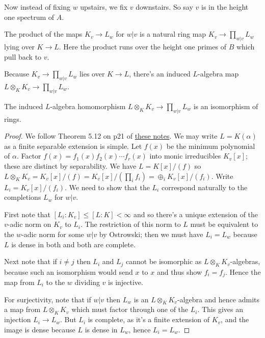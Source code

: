 Now instead of fixing $w$ upstairs, we fix $v$ downstairs. So say $v$ is in the height one
spectrum of $A$.

\begin{definition}
  \label{IsDedekindDomain.HeightOneSpectrum.adicCompletionComapSemialgHom'}
  \leanok
  The product of the maps $K_v\to L_w$ for $w|v$ is a natural ring map $K_v\to\prod_{w|v}L_w$
  lying over $K\to L$. Here the product runs over the height one primes of $B$ which pull back to $v$.
\end{definition}

Because $K_v\to\prod_{w|v}L_w$ lies over $K\to L$, there's an induced $L$-algebra
map $L\otimes_KK_v\to\prod_{w|v}L_w$.

\begin{theorem}
  \label{IsDedekindDomain.HeightOneSpectrum.adicCompletionComapAlgEquiv}
  \leanok
  The induced $L$-algebra homomorphism $L\otimes_KK_v\to\prod_{w|v}L_w$ is an
  isomorphism of rings.
\end{theorem}
\begin{proof}
  We follow Theorem 5.12 on p21 of \href{https://math.berkeley.edu/~ltomczak/notes/Mich2022/LF_Notes.pdf}
  {these notes}. We may write $L=K(\alpha)$ as a finite separable extension is simple. Let $f(x)$
  be the minimum polynomial of $\alpha$. Factor $f(x)=f_1(x)f_2(x)\cdots f_r(x)$ into
  monic irreducibles $K_v[x]$; these are distinct by separability. We have $L=K[x]/(f)$
  so $L\otimes_KK_v=K_v[x]/(f)=K_v[x]/(\prod_i f_i)=\oplus_i K_v[x]/(f_i)$. Write
  $L_i=K_v[x]/(f_i)$. We need to show that the $L_i$ correspond naturally to the completions
  $L_w$ for $w|v$.

  First note that $[L_i:K_v]\leq [L:K]<\infty$ and so there's a unique extension of the $v$-adic
  norm on $K_v$ to $L_i$. The restriction of this norm to $L$ must be equivalent to the $w$-adic
  norm for some $w|v$ by Ostrowski; then we must have $L_i=L_w$ because $L$ is dense in both
  and both are complete.

  Next note that if $i\not=j$ then $L_i$ and $L_j$ cannot be isomorphic as $L\otimes_KK_v$-algebras,
  because such an isomorphism would send $x$ to $x$ and thus show $f_i=f_j$. Hence the map
  from $L_i$ to the $w$ dividing $v$ is injective.

  For surjectivity, note that if $w|v$ then $L_w$ is an $L\otimes_KK_v$-algebra and hence
  admits a map from $L\otimes_K K_v$ which must factor through one of the $L_i$.
  This gives an injection $L_i\to L_w$. But $L_i$ is complete, as it's a finite extension
  of $K_v$, and the image is dense because $L$ is dense in $L_w$, hence $L_i=L_w$.
\end{proof}

